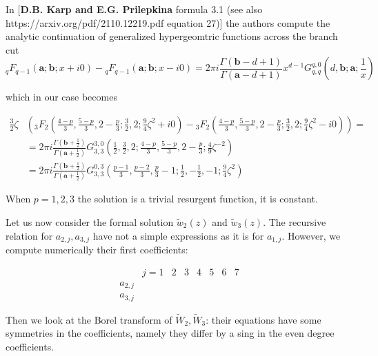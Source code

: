 \documentclass{article}
\begin{document}
In [\textbf{D.B. Karp and E.G. Prilepkina} formula 3.1 (see also \textsf{https://arxiv.org/pdf/2110.12219.pdf} equation 27)] the authors compute the analytic continuation of generalized hypergeomtric functions across the branch cut
\begin{equation}
{}_qF_{q-1}\left(\mathbf{a};\mathbf{b};x+i0\right)-{}_qF_{q-1}\left(\mathbf{a};\mathbf{b};x-i0\right)=2\pi i\frac{\Gamma(\mathbf{b}-d+1)}{\Gamma(\mathbf{a}-d+1)}x^{d-1}G_{q,q}^{q,0}\left(d,\mathbf{b};\mathbf{a};\frac{1}{x}\right)
\end{equation}

which in our case becomes 

\begin{align*}
\frac{3}{2}\zeta&\left({}_3F_2\left(\frac{4-p}{3},\frac{5-p}{3},2-\frac{p}{3};\frac{3}{2},2;\frac{9}{4}\zeta^2+i0\right)-{}_3F_2\left(\frac{4-p}{3},\frac{5-p}{3},2-\frac{p}{3};\frac{3}{2},2;\frac{9}{4}\zeta^2-i0\right)\right)=\\
&=2\pi i\frac{\Gamma(\mathbf{b}+\tfrac{1}{2})}{\Gamma(\mathbf{a}+\tfrac{1}{2})}G_{3,3}^{3,0}\left(\frac{1}{2},\frac{3}{2},2;\frac{4-p}{3},\frac{5-p}{3},2-\frac{p}{3};\frac{4}{9}\zeta^{-2}\right)\\
&=2\pi i\frac{\Gamma(\mathbf{b}+\tfrac{1}{2})}{\Gamma(\mathbf{a}+\tfrac{1}{2})}G_{3,3}^{0,3}\left(\frac{p-1}{3},\frac{p-2}{3},\frac{p}{3}-1;\frac{1}{2},-\frac{1}{2},-1;\frac{9}{4}\zeta^{2}\right)
\end{align*}

When $p=1,2,3$ the solution is a trivial resurgent function, it is constant.


Let us now consider the formal solution $\tilde{w}_2(z)$ and $\tilde{w}_3(z)$. The recursive relation for $a_{2,j},a_{3,j}$ have not a simple expressions as it is for $a_{1,j}$. However, we compute numerically their first coefficients:

\begin{align*}
 &j=1 & 2 & 3& 4& 5& 6& 7 \\
a_{2,j}& & & & & & & \\
a_{3,j}& & & & & & & 
\end{align*}  
\color{black}

Then we look at the Borel transform of $\tilde{W}_2, \tilde{W}_3$: their equations have some symmetries in the coefficients, namely they differ by a sing in the even degree coefficients.  
  



\end{document}
